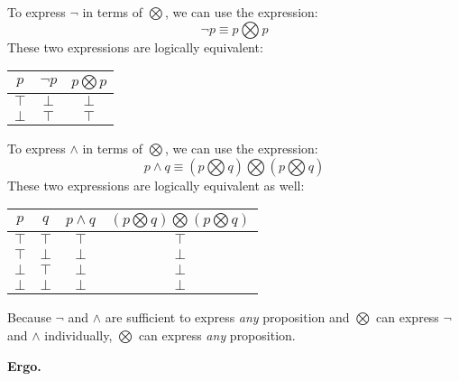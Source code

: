 \documentclass[11pt,a4paper]{article}
\begin{document}
\begin{enumerate}
    To express $\neg$ in terms of $\bigotimes$, we can use the expression:
    \begin{equation*}
        \neg p \equiv p \bigotimes p
    \end{equation*}
    These two expressions are logically equivalent:
    \begin{center}
        \begin{tabular}{||c c c||}
            \hline
            $p$ & $\neg p$ & $p \bigotimes p$ \\
            \hline \hline
            $\top$ & $\bot$ & $\bot$ \\
            \hline
            $\bot$ & $\top$ & $\top$ \\
            \hline
        \end{tabular}
    \end{center}
    To express $\land$ in terms of $\bigotimes$, we can use the expression:
    \begin{equation*}
        p \land q \equiv (p \bigotimes q) \bigotimes (p \bigotimes q)
    \end{equation*}
    These two expressions are logically equivalent as well:
    \begin{center}
        \begin{tabular}{||c c c c||}
            \hline
            $p$ & $q$ & $p \land q$ & $(p \bigotimes q) \bigotimes (p \bigotimes q)$ \\
            \hline \hline
            $\top$ & $\top$ & $\top$ & $\top$ \\
            \hline
            $\top$ & $\bot$ & $\bot$ & $\bot$ \\
            \hline
            $\bot$ & $\top$ & $\bot$ & $\bot$ \\
            \hline
            $\bot$ & $\bot$ & $\bot$ & $\bot$ \\
            \hline
        \end{tabular}
    \end{center}    
    Because $\neg$ and $\land$ are sufficient to express \emph{any} proposition and $\bigotimes$ can express $\neg$ and $\land$ individually, $\bigotimes$ can express \emph{any} proposition.
    \begin{flushright}
            \textbf{Ergo.}
        \end{flushright}
\end{enumerate}
\end{document}
